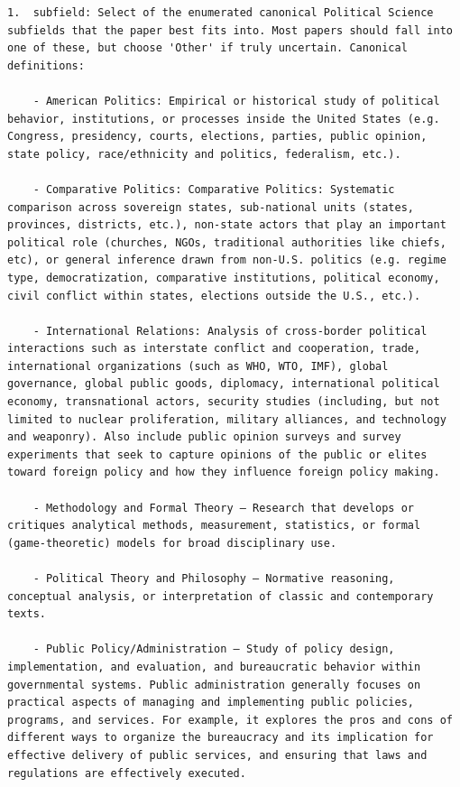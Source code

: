 \documentclass[12pt]{article}
\begin{document}
{\begin{Verbatim}[breaklines=true]
1.  subfield: Select of the enumerated canonical Political Science subfields that the paper best fits into. Most papers should fall into one of these, but choose 'Other' if truly uncertain. Canonical definitions:

    - American Politics: Empirical or historical study of political behavior, institutions, or processes inside the United States (e.g. Congress, presidency, courts, elections, parties, public opinion, state policy, race/ethnicity and politics, federalism, etc.).

    - Comparative Politics: Comparative Politics: Systematic comparison across sovereign states, sub-national units (states, provinces, districts, etc.), non-state actors that play an important political role (churches, NGOs, traditional authorities like chiefs, etc), or general inference drawn from non-U.S. politics (e.g. regime type, democratization, comparative institutions, political economy, civil conflict within states, elections outside the U.S., etc.).

    - International Relations: Analysis of cross-border political interactions such as interstate conflict and cooperation, trade, international organizations (such as WHO, WTO, IMF), global governance, global public goods, diplomacy, international political economy, transnational actors, security studies (including, but not limited to nuclear proliferation, military alliances, and technology and weaponry). Also include public opinion surveys and survey experiments that seek to capture opinions of the public or elites toward foreign policy and how they influence foreign policy making.

    - Methodology and Formal Theory – Research that develops or critiques analytical methods, measurement, statistics, or formal (game-theoretic) models for broad disciplinary use.

    - Political Theory and Philosophy – Normative reasoning, conceptual analysis, or interpretation of classic and contemporary texts.

    - Public Policy/Administration – Study of policy design, implementation, and evaluation, and bureaucratic behavior within governmental systems. Public administration generally focuses on practical aspects of managing and implementing public policies, programs, and services. For example, it explores the pros and cons of different ways to organize the bureaucracy and its implication for effective delivery of public services, and ensuring that laws and regulations are effectively executed. 


\end{Verbatim}}
\end{document}
